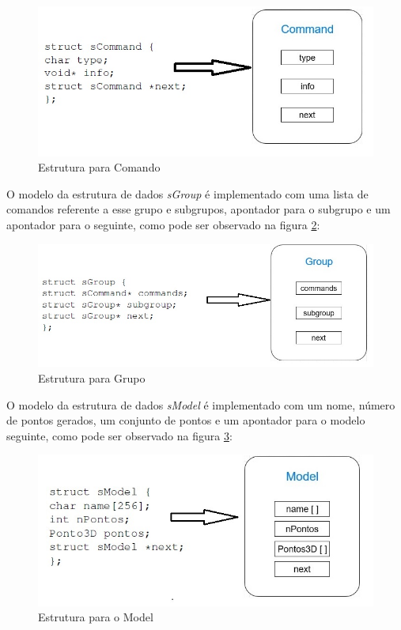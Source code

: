 \begin{figure}[htpb]
	\centering
	\includegraphics[scale=0.5]{imagens/structureCommand.jpg}
	\caption{Estrutura para Comando}
	\label{p1:fig:p1_estruturacomando}
\end{figure}

O modelo da estrutura de dados  \textit{sGroup} é implementado com uma lista de comandos referente a esse grupo e subgrupos, apontador para o subgrupo e um apontador para o seguinte, como pode ser observado na figura \ref{p1:fig:p1_estruturagroup}:

\begin{figure}[htpb]
	\centering
	\includegraphics[scale=0.5]{imagens/structureGroup.jpg}
	\caption{Estrutura para Grupo}
	\label{p1:fig:p1_estruturagroup}
\end{figure}

O modelo da estrutura de dados  \textit{sModel} é implementado com um nome, número de pontos gerados, um conjunto de pontos e um apontador para o modelo seguinte, como pode ser observado na figura \ref{p1:fig:p1_estruturamodel}:

\begin{figure}[htpb]
	\centering
	\includegraphics[scale=0.5]{imagens/structureModel.jpg}
	\caption{Estrutura para o Model}
	\label{p1:fig:p1_estruturamodel}
\end{figure}

